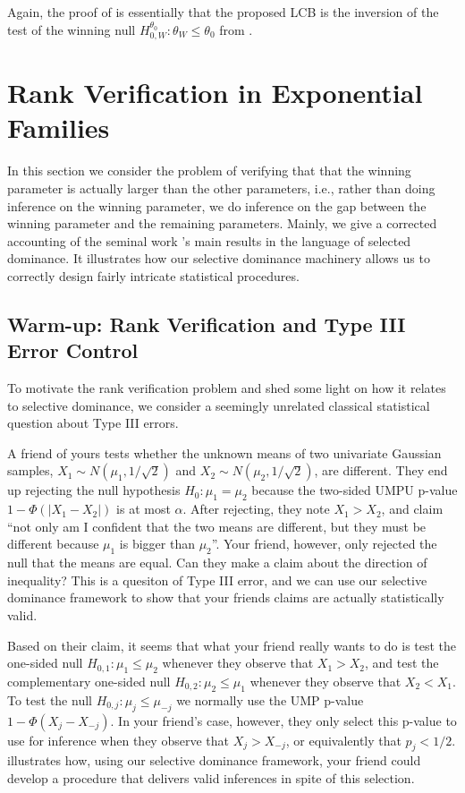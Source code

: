 \documentclass{article}
\begin{document}
Again, the proof of  is essentially that the proposed LCB is the inversion of the test of the winning null $H^{\theta_0}_{0, W}: \theta_W \leq \theta_0$ from . 


\section{Rank Verification in Exponential Families}
\label{sec:rank_verification}

In this section we consider the problem of verifying that that the winning parameter is actually larger than the other parameters, i.e., rather than doing inference on the winning parameter, we do inference on the gap between the winning parameter and the remaining parameters. Mainly, we give a corrected accounting of the seminal work \cite{Hung2019}'s main results in the language of selected dominance. It illustrates how our selective dominance machinery allows us to correctly design fairly intricate statistical procedures.  

\subsection{Warm-up: Rank Verification and Type III Error Control}

To motivate the rank verification problem and shed some light on how it relates to selective dominance, we consider a seemingly unrelated classical statistical question about Type III errors. 

A friend of yours tests whether the unknown means of two univariate Gaussian samples, $X_1 \sim N(\mu_1, 1/\sqrt{2})$ and $X_2 \sim N(\mu_2, 1/\sqrt{2})$, are different. They end up rejecting the null hypothesis $H_0: \mu_1 = \mu_2$ because the two-sided UMPU p-value $1 - \Phi(|X_1 - X_2|)$ is at most $\alpha$. After rejecting, they note $X_1 > X_2$, and claim ``not only am I confident that the two means are different, but they must be different because $\mu_1$ is bigger than $\mu_2$''. Your friend, however, only rejected the null that the means are equal. Can they make a claim about the direction of inequality? This is a quesiton of Type III error, and we can use our selective dominance framework to show that your friends claims are actually statistically valid. 

Based on their claim, it seems that what your friend really wants to do is test the one-sided null $H_{0, 1} : \mu_1 \leq \mu_2$ whenever they observe that $X_1 > X_2$, and test the complementary one-sided null $H_{0, 2} : \mu_2 \leq \mu_1$ whenever they observe that $X_2 < X_1$. To test the null $H_{0, j} : \mu_{j} \leq \mu_{-j}$ we normally use the UMP p-value  $1 - \Phi(X_j - X_{-j})$. In your friend's case, however, they only select this p-value to use for inference when they observe that $X_j > X_{-j}$, or equivalently that $p_j < 1/2$.  illustrates how, using our selective dominance framework, your friend could develop a procedure that delivers valid inferences in spite of this selection.  
\end{document}
